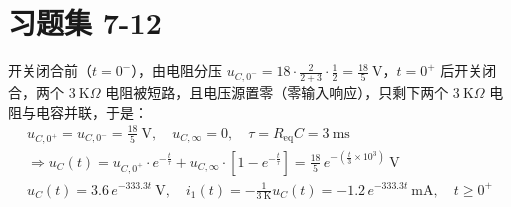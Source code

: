 \documentclass[UTF8]{report}
\def\K{\ \mathrm{K}}
\def\kO{\ \mathrm{K}\Omega}
\theoremstyle{MyLineTheoremStyle} %
\theoremstyle{MyBlockTheoremStyle} %
\theoremstyle{MySubsubsectionStyle} %
\begin{document}
\section{习题集 7-12}
开关闭合前（$t = 0^-$），由电阻分压 $u_{C, 0^-} = 18\cdot \frac{2}{2 + 3}\cdot \frac{1}{2} = \frac{18}{5} \ \mathrm{V}$，$t = 0^+$ 后开关闭合，两个 $3 \kO$ 电阻被短路，且电压源置零（零输入响应），只剩下两个 $3 \kO$ 电阻与电容并联，于是：
\begin{gather}
    u_{C, 0^+} = u_{C, 0^-} = \frac{18}{5} \ \mathrm{V},\quad u_{C, \infty} = 0,\quad \tau = R_{\text{eq}}C = 3 \ \mathrm{ms} \\
    \Longrightarrow 
    u_C(t) = u_{C,0^+}\cdot e^{-\frac{t}{\tau}} + u_{C,\infty}\cdot \left[1 - e^{-\frac{t}{\tau}}\right] = \frac{18}{5} \,e^{-\left(\frac{t}{3}\times 10^3\right)} \ \mathrm{V} \\ 
    \boxed{
        u_C(t) = 3.6 \,e^{-333.3t} \ \mathrm{V},\quad i_1(t) = - \frac{1}{3 \K}u_C(t) = -1.2 \,e^{-333.3t} \ \mathrm{mA},\quad t \geqslant 0^+
    }
\end{gather}
\end{document}
